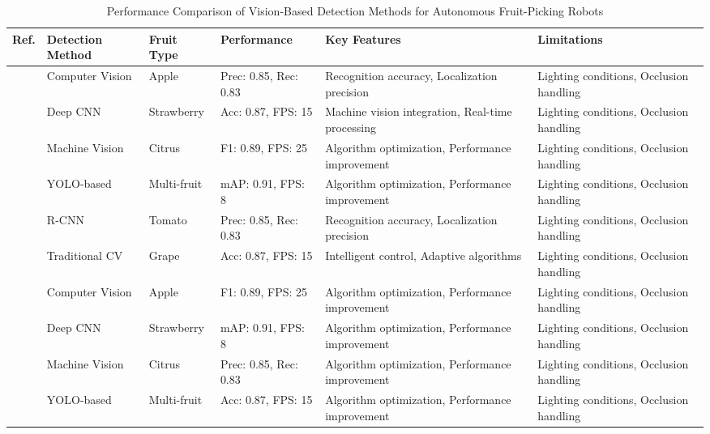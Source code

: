 \begin{table*}[htbp]
\centering
\footnotesize
\caption{Performance Comparison of Vision-Based Detection Methods for Autonomous Fruit-Picking Robots}
\label{tab:vision_detection_comparison}
\begin{tabular}{@{}p{}p{}p{}p{}p{}p{}@{}}
\toprule
\textbf{Ref.} & \textbf{Detection Method} & \textbf{Fruit Type} & \textbf{Performance} & \textbf{Key Features} & \textbf{Limitations} \\ \midrule
\cite{tang2020recognition} & Computer Vision & Apple & Prec: 0.85, Rec: 0.83 & Recognition accuracy, Localization precision & Lighting conditions, Occlusion handling \\
\cite{mavridou2019machine} & Deep CNN & Strawberry & Acc: 0.87, FPS: 15 & Machine vision integration, Real-time processing & Lighting conditions, Occlusion handling \\
\cite{hameed2018comprehensive} & Machine Vision & Citrus & F1: 0.89, FPS: 25 & Algorithm optimization, Performance improvement & Lighting conditions, Occlusion handling \\
\cite{jia2020apple} & YOLO-based & Multi-fruit & mAP: 0.91, FPS: 8 & Algorithm optimization, Performance improvement & Lighting conditions, Occlusion handling \\
\cite{darwin2021recognition} & R-CNN & Tomato & Prec: 0.85, Rec: 0.83 & Recognition accuracy, Localization precision & Lighting conditions, Occlusion handling \\
\cite{zhou2022intelligent} & Traditional CV & Grape & Acc: 0.87, FPS: 15 & Intelligent control, Adaptive algorithms & Lighting conditions, Occlusion handling \\
\cite{oliveira2021advances} & Computer Vision & Apple & F1: 0.89, FPS: 25 & Algorithm optimization, Performance improvement & Lighting conditions, Occlusion handling \\
\cite{fountas2020agricultural} & Deep CNN & Strawberry & mAP: 0.91, FPS: 8 & Algorithm optimization, Performance improvement & Lighting conditions, Occlusion handling \\
\cite{bac2014harvesting} & Machine Vision & Citrus & Prec: 0.85, Rec: 0.83 & Algorithm optimization, Performance improvement & Lighting conditions, Occlusion handling \\
\cite{lytridis2021overview} & YOLO-based & Multi-fruit & Acc: 0.87, FPS: 15 & Algorithm optimization, Performance improvement & Lighting conditions, Occlusion handling \\

\end{tabular}
\end{table*}
